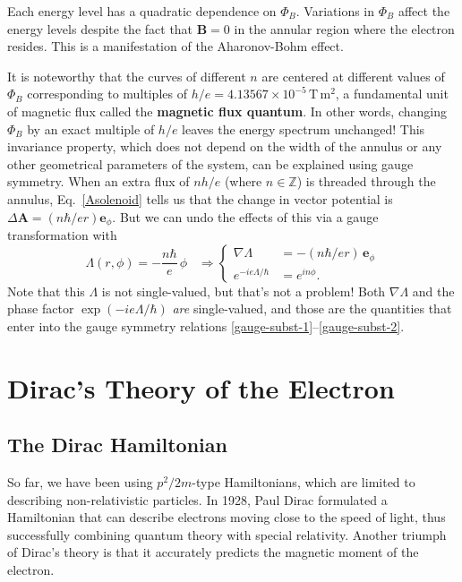 \documentclass[prx,12pt]{revtex4-2}
\begin{document}
Each energy level has a quadratic dependence on $\Phi_B$.  Variations
in $\Phi_B$ affect the energy levels despite the fact that $\mathbf{B}
= 0$ in the annular region where the electron resides.  This is a
manifestation of the Aharonov-Bohm effect.

It is noteworthy that the curves of different $n$ are centered at
different values of $\Phi_B$ corresponding to multiples of $h/e =
4.13567\times10^{-5}\,\mathrm{T}\,\mathrm{m}^2$, a fundamental unit of
magnetic flux called the \textbf{magnetic flux quantum}.  In other
words, changing $\Phi_B$ by an exact multiple of $h/e$ leaves the
energy spectrum unchanged!  This invariance property, which does not
depend on the width of the annulus or any other geometrical parameters
of the system, can be explained using gauge symmetry.  When an extra
flux of $nh/e$ (where $n\in\mathbb{Z}$) is threaded through the
annulus, Eq.~\eqref{Asolenoid} tells us that the change in vector
potential is $\Delta \mathbf{A} = (n\hbar/ e r) \mathbf{e}_\phi$.  But
we can undo the effects of this via a gauge transformation with
\begin{equation}
  \Lambda(r,\phi) = - \frac{n\hbar}{e} \, \phi \;\;\;\Rightarrow
  \begin{cases}\nabla \Lambda &= \displaystyle - (n\hbar/er) \, \mathbf{e}_\phi
    \\ \displaystyle e^{-ie\Lambda/\hbar} &= \displaystyle e^{in\phi}.
  \end{cases}
\end{equation}
Note that this $\Lambda$ is not single-valued, but that's not a
problem!  Both $\nabla\Lambda$ and the phase factor
$\exp(-ie\Lambda/\hbar)$ \textit{are} single-valued, and those are the
quantities that enter into the gauge symmetry relations
\eqref{gauge-subst-1}--\eqref{gauge-subst-2}.

\section{Dirac's Theory of the Electron}

\subsection{The Dirac Hamiltonian}
\label{sec:DiracH}

So far, we have been using $p^2/2m$-type Hamiltonians, which are
limited to describing non-relativistic particles.  In 1928, Paul Dirac
formulated a Hamiltonian that can describe electrons moving close to
the speed of light, thus successfully combining quantum theory with
special relativity. Another triumph of Dirac's theory is that it
accurately predicts the magnetic moment of the electron.
\end{document}
